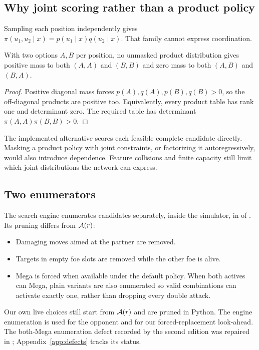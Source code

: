 \subsection{Why joint scoring rather than a product policy}
Sampling each position independently gives
$\pi(u_1,u_2\mid x)=p(u_1\mid x)q(u_2\mid x)$. That family cannot express
coordination.

\begin{proposition}
\label{prop:product}
With two options $A,B$ per position, no unmasked product distribution gives
positive mass to both $(A,A)$ and $(B,B)$ and zero mass to both $(A,B)$ and
$(B,A)$.
\end{proposition}
\begin{proof}
Positive diagonal mass forces $p(A),q(A),p(B),q(B)>0$, so the off-diagonal
products are positive too. Equivalently, every product table has rank one and
determinant zero. The required table has determinant
$\pi(A,A)\pi(B,B)>0$.
\end{proof}

The implemented alternative scores each feasible complete candidate directly.
Masking a product policy with joint constraints, or factorizing it
autoregressively, would also introduce dependence. Feature collisions and
finite capacity still limit which joint distributions the network can express.

\subsection{Two enumerators}
The search engine enumerates candidates separately, inside the simulator, in
 of . Its pruning differs from
$\mathcal{A}(r)$:
\begin{itemize}
  \item Damaging moves aimed at the partner are removed.
  \item Targets in empty foe slots are removed while the other foe is alive.
  \item Mega is forced when available under the default policy. When both
    actives can Mega, plain variants are also enumerated so valid combinations
    can activate exactly one, rather than dropping every double attack.
\end{itemize}
Our own live choices still start from $\mathcal{A}(r)$ and are pruned in Python. The
engine enumeration is used for the opponent and for our forced-replacement
look-ahead. The both-Mega enumeration defect recorded by the second edition
was repaired in ; Appendix~\ref{app:defects} tracks its status.

